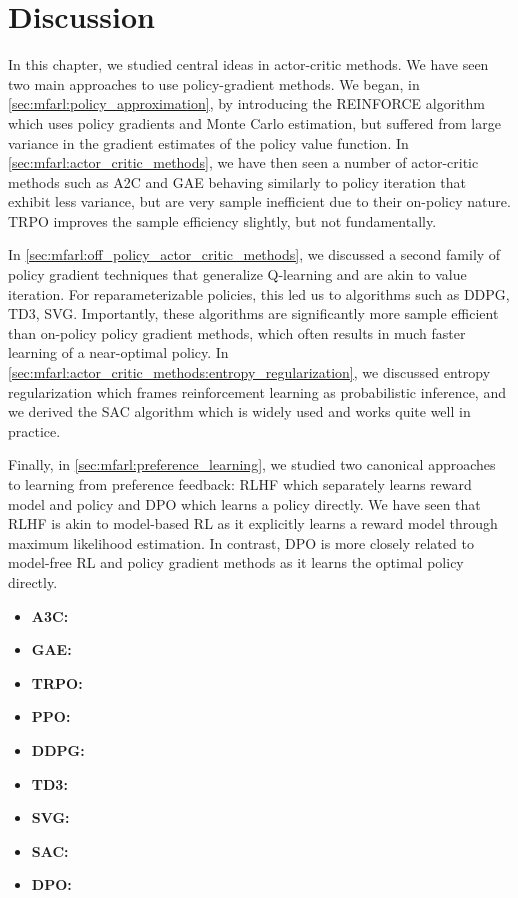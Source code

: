 \section*{Discussion}\label{sec:mfarl:discussion}

In this chapter, we studied central ideas in actor-critic methods.
We have seen two main approaches to use policy-gradient methods.
We began, in \cref{sec:mfarl:policy_approximation}, by introducing the REINFORCE algorithm which uses policy gradients and Monte Carlo estimation, but suffered from large variance in the gradient estimates of the policy value function.
In \cref{sec:mfarl:actor_critic_methods}, we have then seen a number of actor-critic methods such as A2C and GAE behaving similarly to policy iteration that exhibit less variance, but are very sample inefficient due to their on-policy nature.
TRPO improves the sample efficiency slightly, but not fundamentally.

In \cref{sec:mfarl:off_policy_actor_critic_methods}, we discussed a second family of policy gradient techniques that generalize Q-learning and are akin to value iteration.
For reparameterizable policies, this led us to algorithms such as DDPG, TD3, SVG.
Importantly, these algorithms are significantly more sample efficient than on-policy policy gradient methods, which often results in much faster learning of a near-optimal policy.
In \cref{sec:mfarl:actor_critic_methods:entropy_regularization}, we discussed entropy regularization which frames reinforcement learning as probabilistic inference, and we derived the SAC algorithm which is widely used and works quite well in practice.

Finally, in \cref{sec:mfarl:preference_learning}, we studied two canonical approaches to learning from preference feedback: RLHF which separately learns reward model and policy and DPO which learns a policy directly.
We have seen that RLHF is akin to model-based RL as it explicitly learns a reward model through maximum likelihood estimation.
In contrast, DPO is more closely related to model-free RL and policy gradient methods as it learns the optimal policy directly.

\begin{oreadings}
  \begin{itemize}
    \item \textbf{A3C:} 
    \item \textbf{GAE:} 
    \item \textbf{TRPO:} 
    \item \textbf{PPO:} 
    \item \textbf{DDPG:} 
    \item \textbf{TD3:} 
    \item \textbf{SVG:} 
    \item \textbf{SAC:} 
    \item \textbf{DPO:} 
  \end{itemize}
\end{oreadings}


